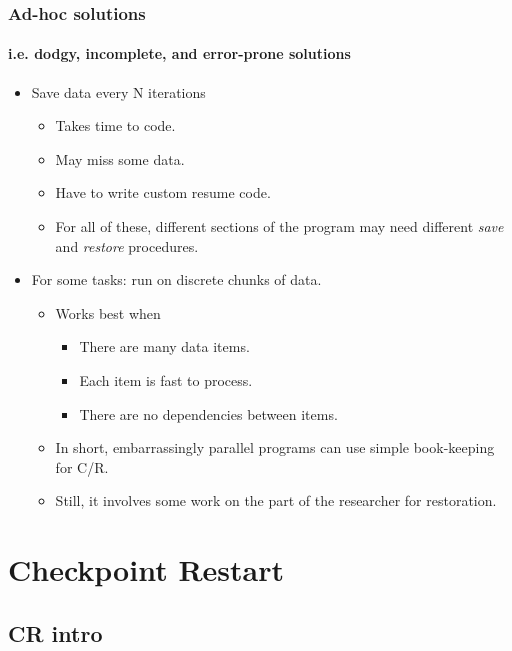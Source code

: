 \documentclass[compress]{beamer}
\begin{document}
\begin{frame}
\frametitle{Ad-hoc solutions}
\framesubtitle{i.e. dodgy, incomplete, and error-prone solutions}

\begin{itemize}
\item{Save data every N iterations}
  \begin{itemize}
  \item{Takes time to code.}
  \item{May miss some data.}
  \item{Have to write custom resume code.}
  \item{For all of these, different sections of the program may need
    different \textit{save} and \textit{restore} procedures.}
  \end{itemize}  
  \item{For some tasks: run on discrete chunks of data.}
    \begin{itemize}
    \item{Works best when}
      \begin{itemize}
      \item{There are many data items.}
      \item{Each item is fast to process.}
      \item{There are no dependencies between items.}
      \end{itemize}
    \item{In short, embarrassingly parallel programs can use simple book-keeping for C/R}.
    \item{Still, it involves some work on the part of the researcher for restoration.}
  \end{itemize}
\end{itemize}

\end{frame}


\section{Checkpoint Restart}  %

\subsection{CR intro}         %
\end{document}
